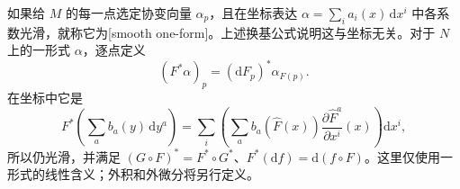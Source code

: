 \ProseParagraphBreak

如果给 \(M\) 的每一点选定协变向量 \(\alpha_p\)，且在坐标表达 \(\alpha=\sum_i a_i(x)\,\mathrm{d}x^i\) 中各系数光滑，就称它为[smooth one-form]。上述换基公式说明这与坐标无关。对于 \(N\) 上的一形式 \(\alpha\)，逐点定义
\[
	(F^*\alpha)_p=(\mathrm{d}F_p)^*\alpha_{F(p)}.
\]
在坐标中它是
\[
	F^*\left(\sum_a b_a(y)\,\mathrm{d}y^a\right)
	=\sum_i\left(\sum_a b_a(\widehat F(x))
	\frac{\partial\widehat F^a}{\partial x^i}(x)\right)\mathrm{d}x^i,
\]
所以仍光滑，并满足 \((G\circ F)^*=F^*\circ G^*\)、\(F^*(\mathrm{d}f)=\mathrm{d}(f\circ F)\)。这里仅使用一形式的线性含义；外积和外微分将另行定义。
